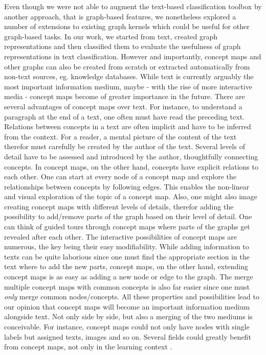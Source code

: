 Even though we were not able to augment the text-based classification toolbox by another approach, that is graph-based features, we nonetheless explored a number of extensions to existing graph kernels which could be useful for other graph-based tasks.
In our work, we started from text, created graph representations and then classified them to evaluate the usefulness of graph representations in text classification.
However and importantly, concept maps and other graphs can also be created from scratch or extracted automatically from non-text sources, eg. knowledge databases.
While text is currently arguably the most important information medium, maybe - with the rise of more interactive media - concept maps become of greater importance in the future.
There are several advantages of concept maps over text.
For instance, to understand a paragraph at the end of a text, one often must have read the preceding text.
Relations between concepts in a text are often implicit and have to be inferred from the context.
For a reader, a mental picture of the content of the text therefor must carefully be created by the author of the text.
Several levels of detail have to be assessed and introduced by the author, thoughtfully connecting concepts.
In concept maps, on the other hand, concepts have explicit relations to each other.
One can start at every node of a concept map and explore the relationships between concepts by following edges.
This enables the non-linear and visual exploration of the topic of a concept map.
Also, one might also image creating concept maps with different levels of details, therefor adding the possibility to add/remove parts of the graph based on their level of detail.
One can think of guided tours through concept maps where parts of the graphs get revealed after each other.
The interactive possibilities of concept maps are numerous, the key being their easy modifiability.
While adding information to texts can be quite laborious since one must find the appropriate section in the text where to add the new parts, concept maps, on the other hand, extending concept maps is as easy as adding a new node or edge to the graph.
The merge multiple concept maps with common concepts is also far easier since one must \textit{only} merge common nodes/concepts.
All these properties and possibilities lead to our opinion that concept maps will become an important information medium alongside text.
Not only side by side, but also a merging of the two mediums is conceivable.
For instance, concept maps could not only have nodes with single labels but assigned texts, images and so on.
Several fields could greatly benefit from concept maps, not only in the learning context \cite{Novak1984}.

